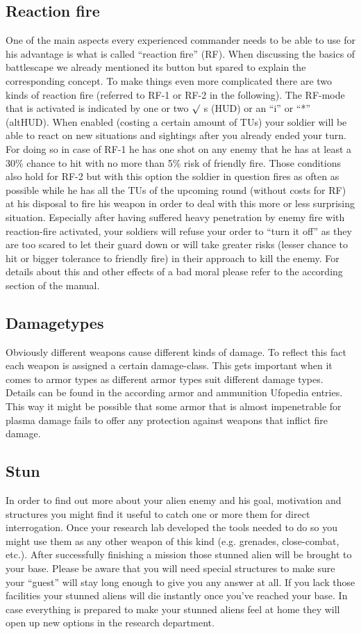 \subsection{Reaction fire}
One of the main aspects every experienced commander needs to be able to use for his advantage is what is called ``reaction fire'' (RF). When discussing the basics of battlescape we already mentioned its button but spared to explain the corresponding concept. To make things even more complicated there are two kinds of reaction fire (referred to RF-1 or RF-2 in the following). The RF-mode that is activated is indicated by one or two $\surd$ s (HUD) or an ``i'' or ``*'' (altHUD). When enabled (costing a certain amount of TUs) your soldier will be able to react on new situations and sightings after you already ended your turn. For doing so in case of RF-1 he has one shot on any enemy that he has at least a 30\% chance to hit with no more than 5\% risk of friendly fire. Those conditions also hold for RF-2 but with this option the soldier in question fires as often as possible while he has all the TUs of the upcoming round (without costs for RF) at his disposal to fire his weapon in order to deal with this more or less surprising situation. Especially after having suffered heavy penetration by enemy fire with reaction-fire activated, your soldiers will refuse your order to ``turn it off'' as they are too scared to let their guard down or will take greater risks (lesser chance to hit or bigger tolerance to friendly fire) in their approach to kill the enemy. For details about this and other effects of a bad moral please refer to the according section of the manual.

\subsection{Damagetypes}
Obviously different weapons cause different kinds of damage. To reflect this fact each weapon is assigned a certain damage-class. This gets important when it comes to armor types as different armor types suit different damage types. Details can be found in the according armor and ammunition Ufopedia entries. This way it might be possible that some armor that is almost impenetrable for plasma damage fails to offer any protection against weapons that inflict fire damage.

\subsection{Stun}
In order to find out more about your alien enemy and his goal, motivation and structures you might find it useful to catch one or more them for direct interrogation. Once your research lab developed the tools needed to do so you might use them as any other weapon of this kind (e.g. grenades, close-combat, etc.). After successfully finishing a mission those stunned alien will be brought to your base. Please be aware that you will need special structures to make sure your ``guest'' will stay long enough to give you any answer at all. If you lack those facilities your stunned aliens will die instantly once you've reached your base. In case everything is prepared to make your stunned aliens feel at home they will open up new options in the research department.

